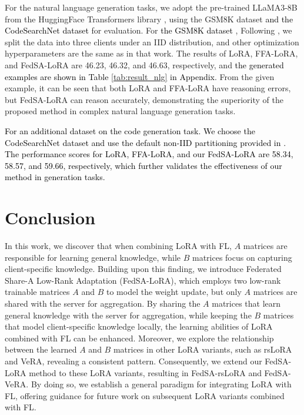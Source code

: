 \documentclass{article} %
\newcommand{\pengxin}[1]{\textcolor{black}{#1}}
\begin{document}
For the natural language generation tasks, we adopt the pre-trained LLaMA3-8B \citep{meta2024introducing} from the HuggingFace Transformers library \citep{wolf2020transformers}, using the GSM8K dataset \citep{cobbe2021training} \pengxin{and the CodeSearchNet dataset \citep{husain2019codesearchnet}} for evaluation. For \pengxin{the GSM8K dataset \citep{cobbe2021training}}, Following \citep{kuang2023federatedscope}, we split the data into three clients under an IID distribution, and other optimization hyperparameters are the same as in that work.
The results of LoRA, FFA-LoRA, and FedSA-LoRA are 46.23, 46.32, and 46.63, respectively, and \pengxin{the generated examples are shown in Table \ref{tab:result_nlg} in Appendix}. From the given example, it can be seen that both LoRA and FFA-LoRA have reasoning errors, but FedSA-LoRA can reason accurately, demonstrating the superiority of the proposed method in complex natural language generation tasks.


\pengxin{For an additional dataset on the code generation task. We choose the CodeSearchNet dataset \citep{husain2019codesearchnet} and use the default non-IID partitioning provided in \citep{kuang2023federatedscope}. The performance scores for LoRA, FFA-LoRA, and our FedSA-LoRA are 58.34, 58.57, and 59.66, respectively, which further validates the effectiveness of our method in generation tasks.}

\vspace{-0.2cm}
\section{Conclusion} \label{sec:conclusion}
\vspace{-0.2cm}

In this work, we discover that when combining LoRA with FL, $A$ matrices are responsible for learning general knowledge, while $B$ matrices focus on capturing client-specific knowledge. Building upon this finding, we introduce Federated Share-A Low-Rank Adaptation (FedSA-LoRA), which employs two low-rank trainable matrices $A$ and $B$ to model the weight update, but only $A$ matrices are shared with the server for aggregation. By sharing the $A$ matrices that learn general knowledge with the server for aggregation, while keeping the $B$ matrices that model client-specific knowledge locally, the learning abilities of LoRA combined with FL can be enhanced. Moreover, we explore the relationship between the learned $A$ and $B$ matrices in other LoRA variants, such as rsLoRA and VeRA, revealing a consistent pattern. Consequently, we extend our FedSA-LoRA method to these LoRA variants, resulting in FedSA-rsLoRA and FedSA-VeRA. By doing so, we establish a general paradigm for integrating LoRA with FL, offering guidance for future work on subsequent LoRA variants combined with FL.
\end{document}

